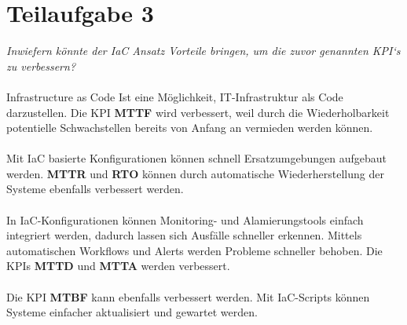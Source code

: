 \chapter{Teilaufgabe 3}

\textit{Inwiefern könnte der IaC Ansatz Vorteile bringen, um die zuvor genannten KPI‘s zu verbessern?}
\\
\\
Infrastructure as Code Ist eine Möglichkeit, IT-Infrastruktur als Code
darzustellen. Die KPI \textbf{MTTF} wird verbessert, weil durch die Wiederholbarkeit
potentielle Schwachstellen bereits von Anfang an vermieden werden können.
\\
\\
Mit IaC basierte Konfigurationen können schnell Ersatzumgebungen aufgebaut werden.
\textbf{MTTR} und \textbf{RTO} können durch automatische Wiederherstellung
der Systeme ebenfalls verbessert werden.
\\
\\
In IaC-Konfigurationen können Monitoring- und Alamierungstools einfach
integriert werden, dadurch lassen sich Ausfälle schneller erkennen.
Mittels automatischen Workflows und Alerts werden Probleme schneller
behoben. Die KPIs \textbf{MTTD} und \textbf{MTTA} werden verbessert.
\\
\\
Die KPI \textbf{MTBF} kann ebenfalls verbessert werden. Mit IaC-Scripts
können Systeme einfacher aktualisiert und gewartet werden.
